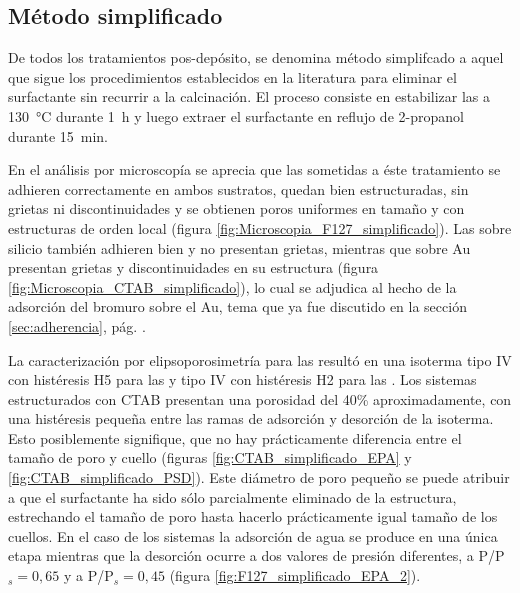 	 \subsection{Método simplificado}

		 	De todos los tratamientos pos-depósito, se denomina método simplifcado a aquel que sigue los procedimientos establecidos en la literatura para eliminar el surfactante sin recurrir a la calcinación.\cite{Angelome2008,Calvo20210,Calvo2010,Fuertes2009} El proceso consiste en estabilizar las \pdm\space a \SI{130}{\celsius} durante \SI{1}{\hour} y luego extraer el surfactante en reflujo de 2-propanol durante \SI{15}{\minute}. 
			
			En el análisis por microscopía se aprecia que las \pdmF\space sometidas a éste tratamiento se adhieren correctamente en ambos sustratos, quedan bien estructuradas, sin grietas ni discontinuidades y se obtienen poros uniformes en tamaño y con estructuras de orden local (figura \ref{fig:Microscopia_F127_simplificado}). Las \pdmC\space sobre silicio también adhieren bien y no presentan grietas, mientras que sobre Au presentan grietas y discontinuidades en su estructura (figura \ref{fig:Microscopia_CTAB_simplificado}), lo cual se adjudica al hecho de la adsorción del bromuro sobre el Au, tema que ya fue discutido en la sección \ref{sec:adherencia}, pág. \pageref{sec:adherencia}. 
			
			La caracterización por elipsoporosimetría para las \pdmF\space resultó en una isoterma tipo IV con histéresis H5 para las \pdmC\space y tipo IV con histéresis H2 para las \pdmF\cite{Thommes2015}. Los sistemas estructurados con CTAB presentan una porosidad del 40\% aproximadamente, con una histéresis pequeña entre las ramas de adsorción y desorción de la isoterma. Esto posiblemente signifique, que no hay prácticamente diferencia entre el tamaño de poro y cuello (figuras \ref{fig:CTAB_simplificado_EPA}  y \ref{fig:CTAB_simplificado_PSD}). Este diámetro de poro pequeño se puede atribuir a que el surfactante ha sido sólo parcialmente eliminado de la estructura, estrechando el tamaño de poro hasta hacerlo prácticamente igual tamaño de los cuellos.
			En el caso de los sistemas \pdmF\space la adsorción de agua se produce en una única etapa mientras que la desorción ocurre a dos valores de presión diferentes, a P/P$_s=0,65$ y a P/P$_s=0,45$ (figura \ref{fig:F127_simplificado_EPA_2}). 

